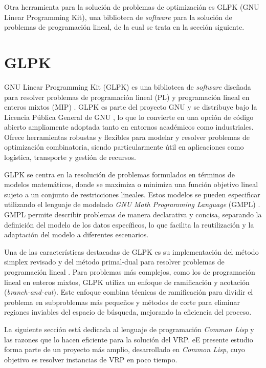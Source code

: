 \documentclass[12pt]{report}
\begin{document}
	 Otra herramienta para la solución de problemas de optimización es GLPK (GNU Linear Programming Kit), una biblioteca de \textit{software} para la solución de problemas de programación lineal, de la cual se trata en la sección siguiente.

	\section{GLPK}
	\label{sec:GLPK}
	GNU Linear Programming Kit (GLPK) es una biblioteca de \textit{software} diseñada para resolver problemas de programación lineal (PL) y programación lineal en enteros mixtos (MIP) \cite{ref25}. GLPK es parte del proyecto GNU y se distribuye bajo la Licencia Pública General de GNU \cite{ref27}, lo que lo convierte en una opción de código abierto ampliamente adoptada tanto en entornos académicos como industriales. Ofrece herramientas robustas y flexibles para modelar y resolver problemas de optimización combinatoria, siendo particularmente útil en aplicaciones como logística, transporte y gestión de recursos.

	GLPK se centra en la resolución de problemas formulados en términos de modelos matemáticos, donde se maximiza o minimiza una función objetivo lineal sujeto a un conjunto de restricciones lineales. Estos modelos se pueden especificar utilizando el lenguaje de modelado \textit{GNU Math Programming Language} (GMPL) \cite{ref26}. GMPL permite describir problemas de manera declarativa y concisa, separando la definición del modelo de los datos específicos, lo que facilita la reutilización y la adaptación del modelo a diferentes escenarios.

	Una de las características destacadas de GLPK es su implementación del método simplex revisado y del método primal-dual para resolver problemas de programación lineal \agregaesto{[REF]}. Para problemas más complejos, como los de programación lineal en enteros mixtos, GLPK utiliza un enfoque de ramificación y acotación (\textit{branch-and-cut}). Este enfoque combina técnicas de ramificación para dividir el problema en subproblemas más pequeños y métodos de corte para eliminar regiones inviables del espacio de búsqueda, mejorando la eficiencia del proceso.

	La siguiente sección está dedicada al lenguaje de programación \textit{Common Lisp} y las razones que lo hacen eficiente para la solución del VRP. eE presente estudio forma parte de un proyecto más amplio, desarrollado en \textit{Common Lisp}, cuyo objetivo es resolver instancias de VRP en poco tiempo.
\end{document}

